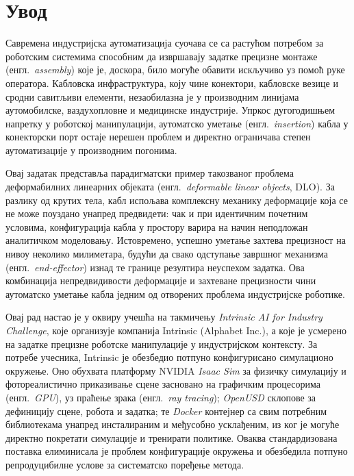 \documentclass[12pt, a4paper]{article}
\begin{document}
\section{Увод}
\label{sec:uvod}
Савремена индустријска аутоматизација суочава се са растућом потребом за роботским системима способним да извршавају задатке прецизне монтаже (енгл.\ \textit{assembly}) које је, доскора, било могуће обавити искључиво уз помоћ руке оператора.
Кабловска инфраструктура, коју чине конектори, кабловске везице и сродни савитљиви елементи, незаобилазна је у производним линијама аутомобилске, ваздухопловне и медицинске индустрије.
Упркос дугогодишњем напретку у роботској манипулацији, аутоматско уметање (енгл.\ \textit{insertion}) кабла у конекторски порт остаје нерешен проблем и директно ограничава степен аутоматизације у производним погонима.

Овај задатак представља парадигматски пример такозваног проблема деформабилних линеарних објеката (енгл.\ \textit{deformable linear objects}, DLO).
За разлику од крутих тела, кабл испољава комплексну механику деформације која се не може поуздано унапред предвидети: чак и при идентичним почетним условима, конфигурација кабла у простору варира на начин неподложан аналитичком моделовању.
Истовремено, успешно уметање захтева прецизност на нивоу неколико милиметара, будући да свако одступање завршног механизма (енгл.\ \textit{end-effector}) изнад те границе резултира неуспехом задатка.
Ова комбинација непредвидивости деформације и захтеване прецизности чини аутоматско уметање кабла једним од отворених проблема индустријске роботике.

Овај рад настао је у оквиру учешћа на такмичењу \textit{Intrinsic AI for Industry Challenge}, које организује компанија Intrinsic (Alphabet Inc.), а које је усмерено на задатке прецизне роботске манипулације у индустријском контексту.
За потребе учесника, Intrinsic је обезбедио потпуно конфигурисано симулационо окружење.
Оно обухвата платформу NVIDIA \textit{Isaac Sim} за физичку симулацију и фотореалистично приказивање сцене засновано на графичким процесорима (енгл.\ \textit{GPU}), уз праћење зрака (енгл.\ \textit{ray tracing}); \textit{OpenUSD} склопове за дефиницију сцене, робота и задатка; те \textit{Docker} контејнер са свим потребним библиотекама унапред инсталираним и међусобно усклађеним, из ког је могуће директно покретати симулације и тренирати политике.
Оваква стандардизована поставка елиминисала је проблем конфигурације окружења и обезбедила потпуно репродуцибилне услове за систематско поређење метода.
\end{document}
